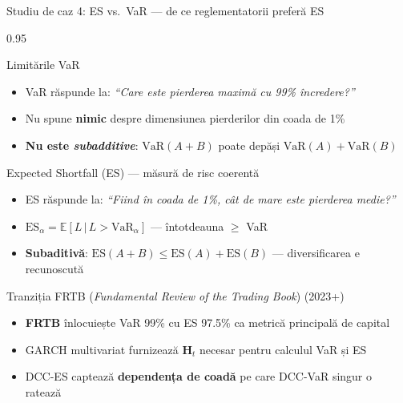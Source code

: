 \documentclass[9pt, aspectratio=169, t]{beamer}
\begin{document}
\begin{frame}{Studiu de caz 4: ES vs.\ VaR --- de ce reglementatorii preferă ES}
    \begin{cminipage}{0.95\textwidth}
    {\footnotesize
    \begin{block}{Limitările VaR}
        \begin{itemize}\setlength{\itemsep}{0pt}
            \item VaR răspunde la: \textit{``Care este pierderea maximă cu 99\% încredere?''}
            \item Nu spune \textbf{nimic} despre dimensiunea pierderilor din coada de 1\%
            \item \textbf{Nu este \textit{subadditive}}: $\text{VaR}(A+B)$ poate depăși $\text{VaR}(A) + \text{VaR}(B)$
        \end{itemize}
    \end{block}
    \vspace{-2mm}
    \begin{block}{Expected Shortfall (ES) --- măsură de risc coerentă}
        \begin{itemize}\setlength{\itemsep}{0pt}
            \item ES răspunde la: \textit{``Fiind în coada de 1\%, cât de mare este pierderea medie?''}
            \item $\text{ES}_\alpha = \mathbb{E}[L \,|\, L > \text{VaR}_\alpha]$ --- întotdeauna $\geq$ VaR
            \item \textbf{Subaditivă}: $\text{ES}(A+B) \leq \text{ES}(A) + \text{ES}(B)$ --- diversificarea e recunoscută
        \end{itemize}
    \end{block}
    \vspace{-2mm}
    \begin{alertblock}{Tranziția FRTB (\textit{Fundamental Review of the Trading Book}) (2023+)}
        \begin{itemize}\setlength{\itemsep}{0pt}
            \item \textbf{FRTB} înlocuiește VaR 99\% cu ES 97.5\% ca metrică principală de capital
            \item GARCH multivariat furnizează $\mathbf{H}_t$ necesar pentru calculul VaR și ES
            \item DCC-ES captează \textbf{dependența de coadă} pe care DCC-VaR singur o ratează
        \end{itemize}
    \end{alertblock}
    }
    \end{cminipage}
\end{frame}
\end{document}
